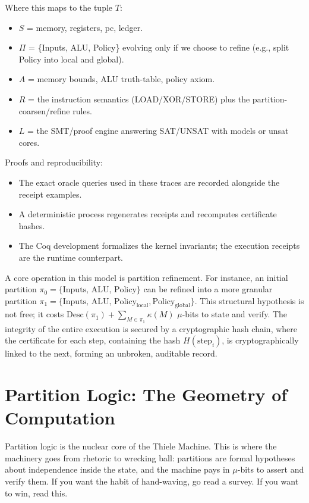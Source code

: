 \documentclass[11pt]{article}
\begin{document}
Where this maps to the tuple $T$:
\begin{itemize}
  \item $S$ = memory, registers, pc, ledger.
  \item $\Pi$ = \{Inputs, ALU, Policy\} evolving only if we choose to refine (e.g., split Policy into local and global).
  \item $A$ = memory bounds, ALU truth-table, policy axiom.
  \item $R$ = the instruction semantics (LOAD/XOR/STORE) plus the partition-coarsen/refine rules.
  \item $L$ = the SMT/proof engine answering SAT/UNSAT with models or unsat cores.
\end{itemize}

Proofs and reproducibility:
\begin{itemize}
  \item The exact oracle queries used in these traces are recorded alongside the receipt examples.
  \item A deterministic process regenerates receipts and recomputes certificate hashes.
  \item The Coq development formalizes the kernel invariants; the execution receipts are the runtime counterpart.
\end{itemize}

A core operation in this model is partition refinement. For instance, an initial partition $\pi_0 = \{\text{Inputs, ALU, Policy}\}$ can be refined into a more granular partition $\pi_1 = \{\text{Inputs, ALU, Policy}_{\text{local}}, \text{Policy}_{\text{global}}\}$. This structural hypothesis is not free; it costs $\mathrm{Desc}(\pi_1) + \sum_{M\in\pi_1}\kappa(M)$ $\mu$-bits to state and verify. The integrity of the entire execution is secured by a cryptographic hash chain, where the certificate for each step, containing the hash $H(\text{step}_i)$, is cryptographically linked to the next, forming an unbroken, auditable record.

\section{Partition Logic: The Geometry of Computation}
Partition logic is the nuclear core of the Thiele Machine. This is where the machinery goes from rhetoric to wrecking ball: partitions are formal hypotheses about independence inside the state, and the machine pays in $\mu$-bits to assert and verify them. If you want the habit of hand-waving, go read a survey. If you want to win, read this.
\end{document}
